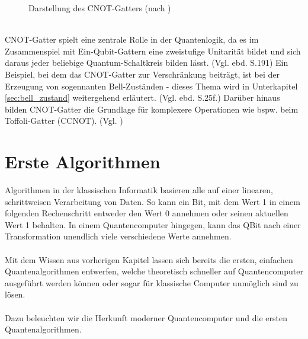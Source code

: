 \begin{figure}[h]
\centering
{}
\caption{Darstellung des CNOT-Gatters (nach \cite[S.178]{nielsen_quantum_2010})}
\end{figure} \\
CNOT-Gatter spielt eine zentrale Rolle in der Quantenlogik, da es im Zusammenspiel mit Ein-Qubit-Gattern eine zweistufige Unitarität bildet und sich daraus jeder beliebige Quantum-Schaltkreis bilden lässt. (Vgl. ebd. S.191) Ein Beispiel, bei dem das CNOT-Gatter zur Verschränkung beiträgt, ist bei der Erzeugung von sogennanten Bell-Zuständen - dieses Thema wird in Unterkapitel \ref{sec:bell_zustand} weitergehend erläutert. (Vgl. ebd. S.25f.) Darüber hinaus bilden CNOT-Gatter die Grundlage für komplexere Operationen wie bspw. beim Toffoli-Gatter (CCNOT). (Vgl. \cite[S.5f., 156f.]{AbuGhanem_a_2025})





\section{Erste Algorithmen}
Algorithmen in der klassischen Informatik basieren alle auf einer linearen, schrittweisen Verarbeitung von Daten. So kann ein Bit, mit dem Wert 1 in einem folgenden Rechenschritt entweder den Wert 0 annehmen oder seinen aktuellen Wert 1 behalten. In einem Quantencomputer hingegen, kann das QBit nach einer Transformation unendlich viele verschiedene Werte annehmen.\\
\\
Mit dem Wissen aus vorherigen Kapitel lassen sich bereits die ersten, einfachen Quantenalgorithmen entwerfen, welche theoretisch schneller auf Quantencomputer ausgeführt werden können oder sogar für klassische Computer unmöglich sind zu lösen. \\
\\
Dazu beleuchten wir die Herkunft moderner Quantencomputer und die ersten Quantenalgorithmen.

